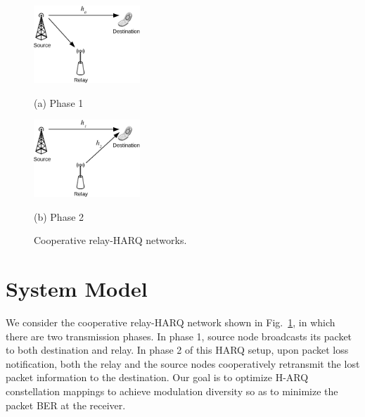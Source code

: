\documentclass[journal]{IEEEtran}
\begin{document}
\begin{figure}[!t]
    \begin{minipage}[b]{0.48\linewidth}
      \centering
      \centerline{\includegraphics[width=4.0cm]{./figs/relayHARQ1.eps}}
      \centerline{(a) Phase 1}\medskip
    \end{minipage}
    \hfill
    \begin{minipage}[b]{.48\linewidth}
      \centering
      \centerline{\includegraphics[width=4.0cm]{./figs/relayHARQ2.eps}}
      \centerline{(b) Phase 2}\medskip
    \end{minipage}
    \caption{Cooperative relay-HARQ networks.}
    \label{fig:system_model}
\end{figure}



\section{System Model}
\label{sec:model}
We consider the cooperative relay-HARQ network shown in
Fig.~\ref{fig:system_model}, in which there are two transmission phases.
In phase 1, source node broadcasts its packet to both destination and relay. In
phase 2 of this HARQ setup, upon packet loss notification, both the relay and
the source nodes cooperatively retransmit the lost packet information to the
destination. Our goal is to optimize  H-ARQ constellation mappings to achieve
modulation diversity so as to minimize the packet BER at the receiver.
\end{document}
